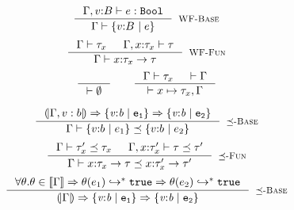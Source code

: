 \renewcommand\restrictdecidable[2]{#2}
\newcommand\addtechnical[2]{#2}
\begin{figure}[t!]
$$
\inference{
	\hastype{\Gamma, v\colon B}{
	\restrictdecidable{p}{e}}{\tbool}
}{
	\iswellformed{\Gamma}{\tref{v}{B}{}{\restrictdecidable{p}{e}}}
}[\rwbase]
$$
$$
\inference{
	\iswellformed{\Gamma}{\tau_x} &&
	\iswellformed{\Gamma, x \colon \tau_x}{\tau}
}{
	\iswellformed{\Gamma}{\tfunref{x}{\tau_x}{\tau}{v}{e}}
}[\rwfun]
$$
$$
\inference{
}{
	\iswellformed{}{\emptyset}
}
\qquad
\inference{
	\iswellformed{\Gamma}{\tau_x} &&
	\iswellformed{}{\Gamma}
}{
	\iswellformed{}{\gbind{x}{\tau_x}, \Gamma}
}
$$


$$
\inference{
	\isimplied{\Gamma, v:b}{\restrictdecidable{p_1}{e_1}}{\restrictdecidable{p_2}{e_2}}
}{
	\issubtype{\Gamma}
		{\tref{v}{b}{}{\restrictdecidable{p_1}{e_1}}}
		{\tref{v}{b}{}{\restrictdecidable{p_2}{e_2}}}
}[\rsubbase]
$$
$$
\inference{
	\issubtype{\Gamma}{\tau'_x}{\tau_x} &&
	\issubtype{\Gamma, x \colon \tau'_x}{\tau}{\tau'}
}{
	\issubtype{\Gamma}{\tfunref{x}{\tau_x}{\tau}{v}{e_1}}{\tfunref{x}{\tau'_x}{\tau'}{v}{e_2}}
}[\rsubfun]
$$
\restrictdecidable{
$$
\inference{
	\interp{\Gamma} \Rightarrow \interp{p_1} \Rightarrow \interp{p_2}
}{
	\isimplied{\Gamma}{p_1}{p_2}
}[\rimpl]
$$}{$$
\inference{
  \forall \theta. \theta \in \interp{\Gamma} 
  \Rightarrow \evals{\thetasub{\sto}{e_1}}{\etrue} 
  \Rightarrow \evals{\thetasub{\sto}{e_2}}{\etrue}
}{
	\isimplied{\Gamma}{e_1}{e_2}
}[\rimpl]
$$}


\end{figure}
